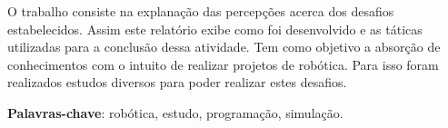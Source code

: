 \begin{thesisresumo}

    O trabalho consiste na explanação das percepções acerca dos desafios estabelecidos. Assim este relatório exibe como foi desenvolvido e as táticas utilizadas para a conclusão dessa atividade. Tem como objetivo a absorção de  conhecimentos com o intuito de realizar projetos de robótica. Para isso foram realizados estudos diversos para poder realizar estes desafios.






\textbf{Palavras-chave}: robótica, estudo, programação, simulação.

\end{thesisresumo}
